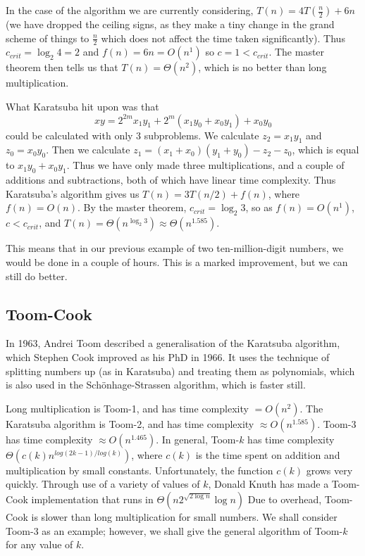 \documentclass[12pt,a4paper]{report}
\begin{document}
\begin{multicols}{2}
In the case of the algorithm we are currently considering, \(T(n)=4T(\frac{n}{2})+6n\) (we have dropped the ceiling signs, as they make a tiny change in the grand scheme of things to \(\frac{n}{2}\) which does not affect the time taken significantly). Thus \(c_{crit}=\log_{2}4=2\) and \(f(n)=6n=O(n^1)\) so \(c=1<c_{crit}\). The master theorem then tells us that \(T(n)=\Theta(n^2)\), which is no better than long multiplication.

What Karatsuba hit upon was that \[xy=2^{2m}x_1y_1+2^m(x_1y_0+x_0y_1)+x_0y_0\] could be calculated with only 3 subproblems. We calculate \(z_2=x_1y_1\) and \(z_0=x_0y_0\). Then we calculate \(z_1=(x_1+x_0)(y_1+y_0)-z_2-z_0\), which is equal to \(x_1y_0+x_0y_1\). Thus we have only made three multiplications, and a couple of additions and subtractions, both of which have linear time complexity. Thus Karatsuba's algorithm gives us \(T(n)=3T(n/2)+f(n)\), where \(f(n)=O(n)\). By the master theorem, \(c_{crit}=\log_{2}3\), so as \(f(n)=O(n^1)\), \(c<c_{crit}\), and \(T(n)=\Theta(n^{\log_{2}3})\approx{}\Theta(n^{1.585})\).

This means that in our previous example of two ten-million-digit numbers, we would be done in a couple of hours. This is a marked improvement, but we can still do better.

\subsection{Toom-Cook}
In 1963, Andrei Toom described a generalisation of the Karatsuba algorithm, which Stephen Cook improved as his PhD in 1966. It uses the technique of splitting numbers up (as in Karatsuba) and treating them as polynomials, which is also used in the Sch\"onhage-Strassen algorithm, which is faster still.

Long multiplication is Toom-1, and has time complexity \(=O(n^2)\). The Karatsuba algorithm is Toom-2, and has time complexity \(\approx{}O(n^1.585)\). Toom-3 has time complexity \(\approx{}O(n^1.465)\). In general, Toom-\(k\) has time complexity \(\Theta(c(k)n^{log(2k-1)/log(k)})\), where \(c(k)\) is the time spent on addition and multiplication by small constants. Unfortunately, the function \(c(k)\) grows very quickly. Through use of a variety of values of \(k\), Donald Knuth has made a Toom-Cook implementation that runs in \(\Theta(n2^{\sqrt{2\log{}n}}\log{}n)\) Due to overhead, Toom-Cook is slower than long multiplication for small numbers. We shall consider Toom-3 as an example; however, we shall give the general algorithm of Toom-\(k\) for any value of \(k\).


\end{multicols}
\end{document}
